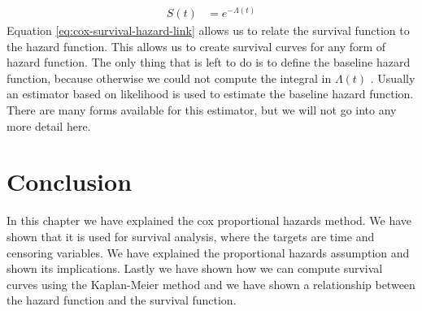 \begin{equation}
\begin{split}
\label{eq:cox-survival-hazard-link}
S(t) &= e^{-\Lambda(t)}
\end{split}
\end{equation}
Equation \ref{eq:cox-survival-hazard-link} allows us to relate the survival function to the hazard function. This allows us to create survival curves for any form of hazard function. The only thing that is left to do is to define the baseline hazard function, because otherwise we could not compute the integral in $\Lambda(t)$ . Usually an estimator based on likelihood is used to estimate the baseline hazard function. There are many forms available for this estimator\cite{royston2011estimating}, but we will not go into any more detail here.

\section{Conclusion}
\label{sec:cox-conclusion}
In this chapter we have explained the cox proportional hazards method. We have shown that it is used for survival analysis, where the targets are time and censoring variables. We have explained the proportional hazards assumption and shown its implications. Lastly we have shown how we can compute survival curves using the Kaplan-Meier method and we have shown a relationship between the hazard function and the survival function.
